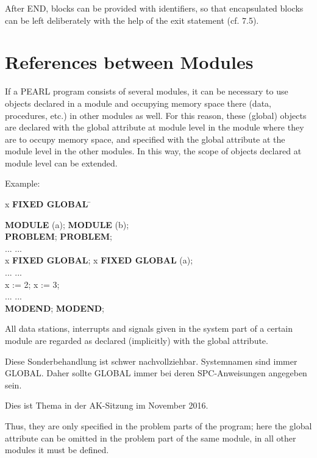 After END, blocks can be provided with identifiers, so that encapsulated
blocks can be left deliberately with the help of the exit statement
(cf. 7.5).

\section{References between Modules}  %
\label{sec_references_module}

If a PEARL program consists of several modules, it can be necessary to
use objects declared in a module and occupying memory space there (data,
procedures, etc.) in other modules as well. For this reason, these
(global) objects are declared with the global attribute at module level
in the module where they are to occupy memory space, and specified with
the global attribute at the module level in the other modules. In this
way, the scope of objects declared at module level can be extended.

Example:

\begin{tabbing}
 x {\bf FIXED GLOBAL} \hspace{2cm} \= \kill

{\bf MODULE} (a);                  \> {\bf MODULE} (b); \\
{\bf PROBLEM};                     \> {\bf PROBLEM};\\
\x ...                             \> \x ...\\
 x {\bf FIXED GLOBAL}; \>  x {\bf FIXED GLOBAL} (a);\\
\x ...                             \> \x ...\\
\x x := 2;                         \> \x x := 3;\\
\x ...                             \> \x ...\\
{\bf MODEND};                      \> {\bf MODEND};
\end{tabbing}

All data stations, interrupts and signals given in the system part of a
certain module are regarded as declared (implicitly) with the global
attribute.
\begin{discuss}
Diese Sonderbehandlung ist schwer nachvollziehbar. 
Systemnamen sind immer GLOBAL. Daher sollte GLOBAL immer 
bei deren SPC-Anweisungen angegeben sein.

Dies ist Thema in der AK-Sitzung im November 2016.

\begin{removed}
Thus, they are only specified in the problem parts of the
program; here the global attribute can be omitted in the problem part of
the same module, in all other modules it must be defined.
\end{removed}
\end{discuss}

